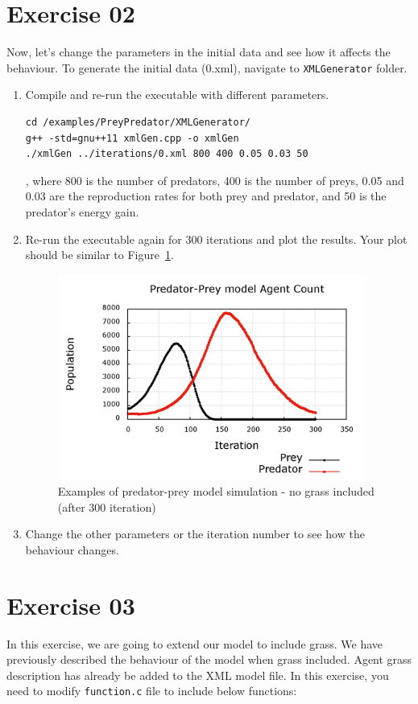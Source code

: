 \section{Exercise 02}
Now, let's change the parameters in the initial data and see how it affects the behaviour. To generate the initial data (0.xml), navigate to \verb|XMLGenerator| folder. 

\begin{enumerate}[{2.1}]
    \item Compile and re-run the executable with different parameters.
\begin{verbatim} 
cd /examples/PreyPredator/XMLGenerator/
g++ -std=gnu++11 xmlGen.cpp -o xmlGen
./xmlGen ../iterations/0.xml 800 400 0.05 0.03 50
\end{verbatim}
, where 800 is the number of predators, 400 is the number of preys, 0.05 and 0.03 are the reproduction rates for both prey and predator, and 50 is the predator's energy gain. 


\item Re-run the executable again for 300 iterations and plot the results. Your plot should be similar to Figure~\ref{fig:simulation_noGrass_exr2}.

\begin{figure}[!h]
    \centering
    \includegraphics[width=4in]{prey_predator}
    \caption{Examples of predator-prey model simulation - no grass included (after 300 iteration)}
    \label{fig:simulation_noGrass_exr2}
\end{figure}

\item Change the other parameters or the iteration number to see how the behaviour changes.
\end{enumerate}
\section{Exercise 03}
In this exercise, we are going to extend our model to include grass. We have previously described the behaviour of the model when grass included. Agent grass description has already be added to the XML model file. In this exercise, you need to modify \verb|function.c| file to include below functions:

